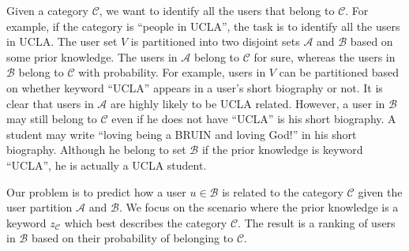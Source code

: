 \documentclass{article}
\begin{document}
Given a category $\mathcal{C}$, we want to identify all the users that belong to $\mathcal{C}$. For example, if the category is ``people in UCLA'', the task is to identify all the users in UCLA. The user set $V$ is partitioned into two disjoint sets $\mathcal{A}$ and $\mathcal{B}$ based on some prior knowledge. The users in $\mathcal{A}$ belong to $\mathcal{C}$ for sure, whereas the users in $\mathcal{B}$ belong to $\mathcal{C}$ with probability. For example, users in $V$ can be partitioned based on whether keyword ``UCLA'' appears in a user's short biography or not. It is clear that users in $\mathcal{A}$ are highly likely to be UCLA related. However, a user in $\mathcal{B}$ may still belong to $\mathcal{C}$ even if he does not have ``UCLA'' is his short biography. A student may write ``loving being a BRUIN and loving God!'' in his short biography. Although he belong to set $\mathcal{B}$ if the prior knowledge is keyword ``UCLA'', he is actually a UCLA student.


Our problem is to predict how a user $u \in \mathcal{B}$ is related to the category $\mathcal{C}$ given the user partition $\mathcal{A}$ and $\mathcal{B}$. We focus on the scenario where the prior knowledge is a keyword $z_{\mathcal{C}}$ which best describes the category $\mathcal{C}$. The result is a ranking of users in $\mathcal{B}$ based on their probability of belonging to $\mathcal{C}$.


\ifx \allfiles \undefined
\end{document}
